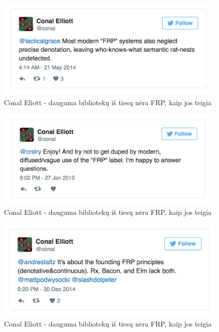 \documentclass{VUMIFPSmagistrinis}
\begin{document}
\begin{figure}[H]
    \centering
    \includegraphics[scale=0.5]{img/not_frp5}
    \caption{Conal Eliott - dauguma bibliotekų iš tiesų nėra FRP, kaip jos teigia}
    \label{img:not_frp5}
\end{figure}

\begin{figure}[H]
    \centering
    \includegraphics[scale=0.5]{img/not_frp6}
    \caption{Conal Eliott - dauguma bibliotekų iš tiesų nėra FRP, kaip jos teigia}
    \label{img:not_frp6}
\end{figure}

\begin{figure}[H]
    \centering
    \includegraphics[scale=0.5]{img/not_frp7}
    \caption{Conal Eliott - dauguma bibliotekų iš tiesų nėra FRP, kaip jos teigia}
    \label{img:not_frp7}
\end{figure}
\end{document}
